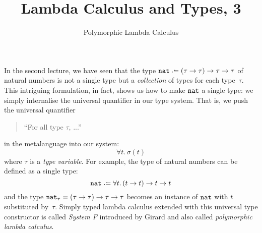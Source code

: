 \title{Lambda Calculus and Types, 3}
\subtitle{Polymorphic Lambda Calculus}

\begin{frame}
\maketitle
\end{frame}

In the second lecture, we have seen that the type $\nat \defeq (\tau \to \tau)
\to \tau \to \tau$ of natural numbers is not a single type but a
\emph{collection} of types for each type~$\tau$. This intriguing formulation, in
fact, shows us how to make $\mathtt{nat}$ a single type: we simply internalise the
universal quantifier in our type system. That is, we push the universal
quantifier 
\begin{quote}
``For all type $\tau$, ...''
\end{quote}
in the metalanguage into our system:
\[
  \forall t.\, \sigma(t)
\]
where $\tau$ is a \emph{type variable}. For example, the type of natural numbers
can be defined as a single type:
\[
  \nat \defeq \forall t.\, (t \to t) \to t \to t
\]
and the type $\mathtt{nat}_\tau = (\tau \to \tau) \to \tau \to \tau$ becomes an instance
of $\mathtt{nat}$ with $t$ substituted by~$\tau$.  Simply
typed lambda calculus extended with this universal type constructor is called
\emph{System F} introduced by Girard and also called \emph{polymorphic lambda
  calculus}.

